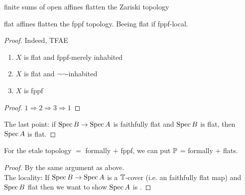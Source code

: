 \begin{example}
	 finite sums of open affines flatten the Zariski topology
\end{example}
\begin{example}
	flat affines flatten the fppf topology. Beeing flat if fppf-local.
\end{example}
\begin{proof}
	 Indeed, TFAE
	 \begin{enumerate}
	 	\item  $X$ is flat and fppf-merely inhabited
	 	\item $X$ is flat  and $\lnot\lnot$-inhabited
	 	\item $X$ is fppf
	 \end{enumerate}
 
	\begin{proof}
		$1 \Rightarrow 2 \Rightarrow 3 \Rightarrow 1$ \todocite
	\end{proof}	 
	The last point: if $\operatorname{Spec} B \to \operatorname{Spec} A$ is faithfully flat and $\operatorname{Spec} B$ is flat, then $\operatorname{Spec} A$ is flat.
\end{proof}
\begin{example}
	For the etale topology $=$ formally \etale $+$ fppf, we can put $\mathbb{P}$ = formally \etale + flats. %
\end{example}
\begin{proof}
	By the same argument as above. \\
	The locality: If $\operatorname{Spec} B \to \operatorname{Spec} A$ is a $\mathbb{T}$-cover (i.e. an \etale faithfully flat map) and $\operatorname{Spec} B$ \etale flat then we want to show $\operatorname{Spec} A$ is \etale. 
\end{proof}

